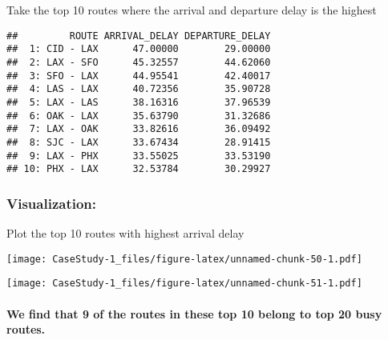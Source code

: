 \documentclass[]{article}
\let\oldparagraph\paragraph
\renewcommand{\paragraph}[1]{\oldparagraph{#1}\mbox{}}
\begin{document}
Take the top 10 routes where the arrival and departure delay is the
highest

\begin{verbatim}
##         ROUTE ARRIVAL_DELAY DEPARTURE_DELAY
##  1: CID - LAX      47.00000        29.00000
##  2: LAX - SFO      45.32557        44.62060
##  3: SFO - LAX      44.95541        42.40017
##  4: LAS - LAX      40.72356        35.90728
##  5: LAX - LAS      38.16316        37.96539
##  6: OAK - LAX      35.63790        31.32686
##  7: LAX - OAK      33.82616        36.09492
##  8: SJC - LAX      33.67434        28.91415
##  9: LAX - PHX      33.55025        33.53190
## 10: PHX - LAX      32.53784        30.29927
\end{verbatim}

\hypertarget{visualization}{%
\subsubsection{Visualization:}\label{visualization}}

Plot the top 10 routes with highest arrival delay

\texttt{[image: CaseStudy-1\_files/figure-latex/unnamed-chunk-50-1.pdf]}

\texttt{[image: CaseStudy-1\_files/figure-latex/unnamed-chunk-51-1.pdf]}

\hypertarget{we-find-that-9-of-the-routes-in-these-top-10-belong-to-top-20-busy-routes.}{%
\paragraph{We find that 9 of the routes in these top 10 belong to top 20
busy
routes.}\label{we-find-that-9-of-the-routes-in-these-top-10-belong-to-top-20-busy-routes.}}
\end{document}
